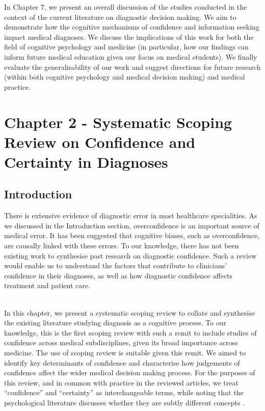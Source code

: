 \documentclass[a4paper, nobind]{templates/ociamthesis}
\begin{document}
\hfill\break
In Chapter 7, we present an overall discussion of the studies conducted in the context of the current literature on diagnostic decision making. We aim to demonstrate how the cognitive mechanisms of confidence and information seeking impact medical diagnoses. We discuss the implications of this work for both the field of cognitive psychology and medicine (in particular, how our findings can inform future medical education given our focus on medical students). We finally evaluate the generalisability of our work and suggest directions for future research (within both cognitive psychology and medical decision making) and medical practice.

\chapter*{Chapter 2 - Systematic Scoping Review on Confidence and Certainty in Diagnoses}\label{chapter-2---systematic-scoping-review-on-confidence-and-certainty-in-diagnoses}

\adjustmtc
{}

\section*{Introduction}\label{introduction}

There is extensive evidence of diagnostic error in most healthcare specialities. As we discussed in the Introduction section, overconfidence is an important source of medical error. It has been suggested that cognitive biases, such as overconfidence, are causally linked with these errors. To our knowledge, there has not been existing work to synthesise past research on diagnostic confidence. Such a review would enable us to understand the factors that contribute to clinicians' confidence in their diagnoses, as well as how diagnostic confidence affects treatment and patient care.\\
\strut \\
In this chapter, we present a systematic scoping review to collate and synthesise the existing literature studying diagnosis as a cognitive process. To our knowledge, this is the first scoping review with such a remit to include studies of confidence across medical subdisciplines, given its broad importance across medicine. The use of scoping review is suitable given this remit. We aimed to identify key determinants of confidence and characterise how judgements of confidence affect the wider medical decision making process. For the purposes of this review, and in common with practice in the reviewed articles, we treat ``confidence'' and ``certainty'' as interchangeable terms, while noting that the psychological literature discusses whether they are subtly different concepts \autocite{pouget_confidence_2016}.
\end{document}
